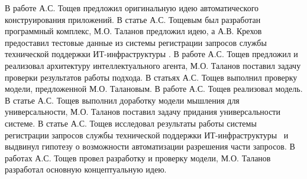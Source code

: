В работе  \cite{Lobachevskii} А.С. Тощев предложил оригинальную идею автоматического конструирования приложений. В статье \cite{WCIT-2012} А.С. Тощевым был разработан программный комплекс, М.О. Таланов предложил идею, а А.В. Крехов предоставил тестовые данные из системы регистрации запросов службы технической поддержки ИТ-инфраструктуры \icl. В работе \cite{ISGZ} А.С. Тощев предложил и реализовал архитектуру интеллектуального агента, М.О. Таланов поставил задачу проверки результатов работы подхода. В статьях \cite{IJSE-1, IJSE-2} А.С. Тощев выполнил проверку модели, предложенной М.О. Талановым. В работе \cite{RCDL-2014} А.С. Тощев реализовал модель. В статье \cite{ AMSTA-2015} А.С. Тощев выполнил доработку модели мышления для универсальности, М.О. Таланов поставил задачу придания универсальности системе. В статье \cite{VAK-1} А.С. Тощев исследовал результаты работы системы регистрации запросов службы технической поддержки ИТ-инфраструктуры \icl\ и выдвинул гипотезу о возможности автоматизации разрешения части запросов. В работах \cite{EB-1, EB-2} А.С. Тощев провел разработку и проверку модели, М.О. Таланов разработал основную концептуальную идею. \par


